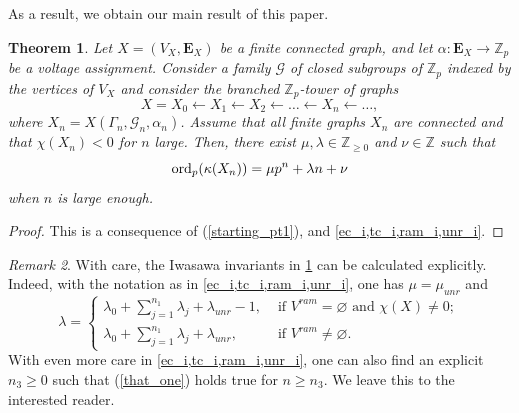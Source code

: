 \documentclass[11pt]{amsart}
\newtheorem{theorem}{Theorem}[section]
\numberwithin{equation}{section}
\theoremstyle{remark}
\newtheorem{remark}[theorem]{Remark}
\theoremstyle{definition}
\begin{document}
As a result, we obtain our main result of this paper.
\begin{theorem} \label{main}
Let $X = (V_{X},\mathbf{E}_{X})$ be a finite connected graph, and let $\alpha:\mathbf{E}_{X} \rightarrow \mathbb{Z}_{p}$ be a voltage assignment.  Consider a family $\mathcal{G}$ of closed subgroups of $\mathbb{Z}_{p}$ indexed by the vertices of $V_{X}$ and consider the branched $\mathbb{Z}_{p}$-tower of graphs
$$X = X_{0} \leftarrow X_{1} \leftarrow X_{2} \leftarrow \ldots \leftarrow X_{n} \leftarrow \ldots, $$
where $X_{n} = X(\Gamma_{n},\mathcal{G}_{n},\alpha_{n})$.  Assume that all finite graphs $X_{n}$ are connected and that $\chi(X_{n}) < 0$ for $n$ large.  Then, there exist $\mu,\lambda \in \mathbb{Z}_{\ge 0}$ and $\nu \in \mathbb{Z}$ such that
\begin{equation} \label{that_one}
{\rm ord}_{p}(\kappa(X_{n})) = \mu p^{n} + \lambda n + \nu 
\end{equation}
when $n$ is large enough.
\end{theorem}
\begin{proof}
This is a consequence of (\ref{starting_pt1}), and \cref{ec_i,tc_i,ram_i,unr_i}.
\end{proof}

\begin{remark}\label{lambda explicit}
With care, the Iwasawa invariants in \cref{main} can be calculated explicitly.  Indeed, with the notation as in \cref{ec_i,tc_i,ram_i,unr_i}, one has $\mu = \mu_{unr}$ and
\begin{equation*}
\lambda = 
\begin{cases}
\lambda_{0} + \sum_{j=1}^{n_{1}} \lambda_{j} + \lambda_{unr} - 1, & \text{ if } V^{ram} = \varnothing \text{ and } \chi(X) \neq 0;\\
\lambda_{0} + \sum_{j=1}^{n_{1}} \lambda_{j} + \lambda_{unr}, & \text{ if } V^{ram} \neq \varnothing.
\end{cases}
\end{equation*}
With even more care in \cref{ec_i,tc_i,ram_i,unr_i}, one can also find an explicit $n_{3} \ge 0$ such that (\ref{that_one}) holds true for $n \ge n_{3}$.  We leave this to the interested reader.
\end{remark}





\end{document}
